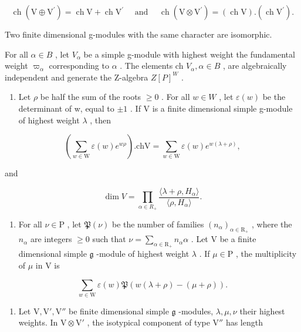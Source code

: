 \[
\operatorname{ch} \left(\mathrm{V} \oplus \mathrm{V} ^ {\prime}\right) = \operatorname{ch} \mathrm{V} + \operatorname{ch} \mathrm{V} ^ {\prime} \quad \text { and } \quad \operatorname{ch} \left(\mathrm{V} \otimes \mathrm{V} ^ {\prime}\right) = (\operatorname{ch} \mathrm{V}). (\operatorname{ch} \mathrm{V} ^ {\prime}).
\]

Two finite dimensional g-modules with the same character are isomorphic.

For all \(\alpha\in B\) , let \(V_{\alpha}\) be a simple g-module with highest weight the fundamental weight \(\varpi_{\alpha}\) corresponding to \(\alpha\) . The elements ch \(V_{\alpha},\alpha\in B\) , are algebraically independent and generate the Z-algebra \(Z[P]^{W}\) .

\begin{enumerate}
\def\labelenumi{\arabic{enumi})}
\setcounter{enumi}{25}
\tightlist
\item
  Let \(\rho\) be half the sum of the roots \(\geq 0\) . For all \(w \in W\) , let \(\varepsilon(w)\) be the determinant of w, equal to \(\pm 1\) . If V is a finite dimensional simple g-module of highest weight \(\lambda\) , then
\end{enumerate}

\[
\left(\sum_ {w \in \mathrm{W}} \varepsilon (w) e ^ {w \rho}\right). \mathrm{chV} = \sum_ {w \in \mathrm{W}} \varepsilon (w) e ^ {w (\lambda + \rho)},
\]

and

\[
\dim V = \prod_ {\alpha \in R _ {+}} \frac {\langle \lambda + \rho , H _ {\alpha} \rangle}{\langle \rho , H _ {\alpha} \rangle}.
\]

\begin{enumerate}
\def\labelenumi{\arabic{enumi})}
\setcounter{enumi}{26}
\tightlist
\item
  For all \(\nu \in \mathrm{P}\) , let \(\mathfrak{P}(\nu)\) be the number of families \((n_{\alpha})_{\alpha \in \mathrm{R}_{+}}\) , where the \(n_{\alpha}\) are integers \(\geq 0\) such that \(\nu = \sum_{\alpha \in \mathrm{R}_{+}} n_{\alpha} \alpha\) . Let \(\mathrm{V}\) be a finite dimensional simple \(\mathfrak{g}\) -module of highest weight \(\lambda\) . If \(\mu \in \mathrm{P}\) , the multiplicity of \(\mu\) in \(\mathrm{V}\) is
\end{enumerate}

\[
\sum_ {w \in \mathrm{W}} \varepsilon (w) \mathfrak {P} (w (\lambda + \rho) - (\mu + \rho)).
\]

\begin{enumerate}
\def\labelenumi{\arabic{enumi})}
\setcounter{enumi}{27}
\tightlist
\item
  Let \(\mathrm{V}, \mathrm{V}', \mathrm{V}''\) be finite dimensional simple \(\mathfrak{g}\) -modules, \(\lambda, \mu, \nu\) their highest weights. In \(\mathrm{V} \otimes \mathrm{V}'\) , the isotypical component of type \(\mathrm{V}''\) has length
\end{enumerate}

